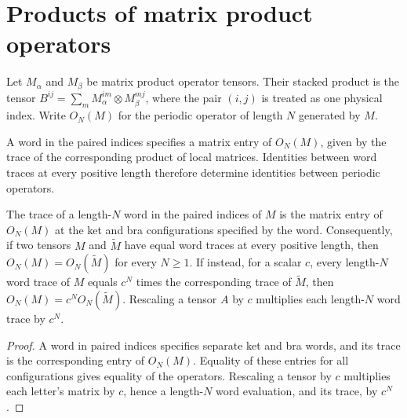 \section{Products of matrix product operators}%
\label{sec:asym_mpo_product}

Let $M_\alpha$ and $M_\beta$ be matrix product operator tensors. Their
stacked product is the tensor
$B^{ij}=\sum_m M_\alpha^{im}\otimes M_\beta^{mj}$,
where the pair $(i,j)$ is treated as one physical index. Write $O_N(M)$
for the periodic operator of length $N$ generated by $M$.

A word in the paired indices specifies a matrix entry of $O_N(M)$, given by
the trace of the corresponding product of local matrices. Identities between
word traces at every positive length therefore determine identities between
periodic operators.

\begin{lemma}%
    \label{lem:asym_mpo_trace_eq}
    \leanok
    The trace of a length-$N$ word in the paired indices of $M$ is the
    matrix entry of $O_N(M)$ at the ket and bra configurations specified
    by the word. Consequently, if two tensors $M$ and $\widetilde M$
    have equal word traces at every positive length, then
    $O_N(M)=O_N(\widetilde M)$ for every $N\geq1$. If instead, for a
    scalar $c$, every length-$N$ word trace of $M$ equals $c^N$ times
    the corresponding trace of $\widetilde M$, then
    $O_N(M)=c^NO_N(\widetilde M)$. Rescaling a tensor
    $A$ by $c$ multiplies each length-$N$ word trace by $c^N$.
\end{lemma}

\begin{proof}\leanok
    A word in paired indices specifies separate ket and bra words, and
    its trace is the corresponding entry of $O_N(M)$. Equality of these
    entries for all configurations gives equality of the operators.
    Rescaling a tensor by $c$ multiplies each letter's matrix by $c$,
    hence a length-$N$ word evaluation, and its trace, by $c^N$.
\end{proof}


